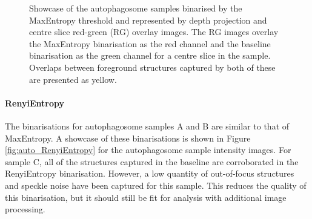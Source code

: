 \begin{figure}
	\caption[Showcase of the autophagosome samples binarised by the MaxEntropy threshold and represented by depth projection and red-green overlay images.]{Showcase of the autophagosome samples binarised by the MaxEntropy threshold and represented by depth projection and centre slice red-green (RG) overlay images. The RG images overlay the MaxEntropy binarisation as the red channel and the baseline binarisation as the green channel for a centre slice in the sample. Overlaps between foreground structures captured by both of these are presented as yellow.}
	\label{fig:auto_MaxEntropy}
\end{figure}

\FloatBarrier
\paragraph{RenyiEntropy}
The binarisations for autophagosome samples A and B are similar to that of MaxEntropy. A showcase of these binarisations is shown in Figure \ref{fig:auto_RenyiEntropy} for the autophagosome sample intensity images. For sample C, all of the structures captured in the baseline are corroborated in the RenyiEntropy binarisation. However, a low quantity of out-of-focus structures and speckle noise have been captured for this sample. This reduces the quality of this binarisation, but it should still be fit for analysis with additional image processing.

